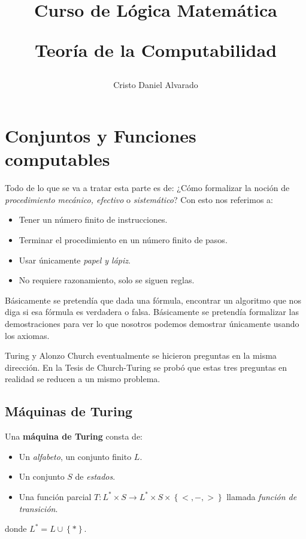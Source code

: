\documentclass[12pt]{report}
\newcounter{it}
\theoremstyle{largebreak}
\newcommand\cf[3]{\ensuremath{#1:#2\rightarrow#3}}
\begin{document}
    \setlength{\parskip}{5pt} %
    \setlength{\parindent}{12pt} %
    \title{Curso de Lógica Matemática
    
    Teoría de la Computabilidad}
    \author{Cristo Daniel Alvarado}
    \maketitle

    \tableofcontents %

    \newpage

    \setcounter{chapter}{2}

    \chapter{Conjuntos y Funciones computables}

    Todo de lo que se va a tratar esta parte es de: ¿Cómo formalizar la noción de \textit{procedimiento mecánico, efectivo} o \textit{sistemático}? Con esto nos referimos a:
    \begin{itemize}
        \item Tener un número finito de instrucciones.
        \item Terminar el procedimiento en un número finito de pasos.
        \item Usar únicamente \textit{papel y lápiz}.
        \item No requiere razonamiento, solo se siguen reglas.
    \end{itemize}

    Básicamente se pretendía que dada una fórmula, encontrar un algoritmo que nos diga si esa fórmula es verdadera o falsa. Básicamente se pretendía formalizar las demostraciones para ver lo que nosotros podemos demostrar únicamente usando los axiomas.

    Turing y Alonzo Church eventualmente se hicieron preguntas en la misma dirección. En la Tesis de Church-Turing se probó que estas tres preguntas en realidad se reducen a un mismo problema.

    \section{Máquinas de Turing}

    \begin{mydef}
        Una \textbf{máquina de Turing} consta de:
        \begin{itemize}
            \item Un \textit{alfabeto}, un conjunto finito $L$.
            \item Un conjunto $S$ de \textit{estados}.
            \item Una función parcial $\cf{T}{L^*\times S}{L^*\times S\times\left\{<,-,> \right\}}$ llamada \textit{función de transición}.
        \end{itemize}
        donde $L^*=L\cup\left\{* \right\}$.
    \end{mydef}
\end{document}
